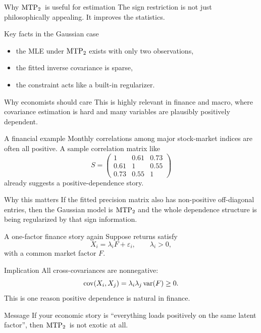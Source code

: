 \documentclass[dvipsnames,aspectratio=169,handout]{beamer}
\begin{document}
\begin{frame}{Why ${\rm MTP}_{2}$\ is useful for estimation}
The sign restriction is not just philosophically appealing.
It improves the statistics.

\begin{block}{Key facts in the Gaussian case}
\begin{itemize}
    \item the MLE under ${\rm MTP}_{2}$ exists with only two observations,
    \item the fitted inverse covariance is sparse,
    \item the constraint acts like a built-in regularizer.
\end{itemize}
\end{block}

\begin{alertblock}{Why economists should care}
This is highly relevant in finance and macro, where covariance estimation is hard and many variables are plausibly positively dependent.
\end{alertblock}
\end{frame}

\begin{frame}{A financial example}
Monthly correlations among major stock-market indices are often all positive.
A sample correlation matrix like
\[
S=\begin{pmatrix}
1 & 0.61 & 0.73\\
0.61 & 1 & 0.55\\
0.73 & 0.55 & 1
\end{pmatrix}
\]
already suggests a positive-dependence story.

\begin{block}{Why this matters}
If the fitted precision matrix also has non-positive off-diagonal entries,
then the Gaussian model is ${\rm MTP}_{2}$ and the whole dependence structure is being regularized by that sign information.
\end{block}
\end{frame}

\begin{frame}{A one-factor finance story again}
Suppose returns satisfy
\[
X_i = \lambda_i F + \varepsilon_i,
\qquad \lambda_i > 0,
\]
with a common market factor $F$.

\begin{alertblock}{Implication}
All cross-covariances are nonnegative:
\[
\operatorname{cov}(X_i,X_j)=\lambda_i\lambda_j\operatorname{var}(F)\geq 0.
\]
This is one reason positive dependence is natural in finance.
\end{alertblock}

\begin{block}{Message}
If your economic story is ``everything loads positively on the same latent factor'', then ${\rm MTP}_{2}$\ is not exotic at all.
\end{block}
\end{frame}
\end{document}
